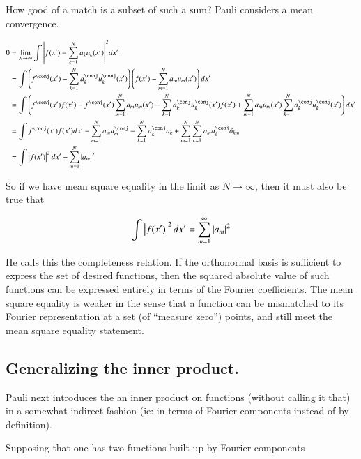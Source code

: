 \documentclass{article}
\begin{document}
How good of a match is a subset of such a sum?  Pauli considers a mean convergence.

\begin{align*}
0 &= \lim_{N \rightarrow \infty}\int 
{\Abs{f(x') -\sum_{k=1}^N a_k u_k(x') }}^2 dx'  \\
&=
\int \left(f^\conj(x') -\sum_{k=1}^N a_k^\conj u_k^\conj(x') \right) \left(f(x') - \sum_{m=1}^N a_m u_m(x') \right) 
dx' \\
&=
\int 
\left( f^\conj(x') f(x') 
-f^\conj(x') \sum_{m=1}^N a_m u_m(x') 
- \sum_{k=1}^N a_k^\conj u_k^\conj(x') f(x') 
+ \sum_{m=1}^N a_m u_m(x') \sum_{k=1}^N a_k^\conj u_k^\conj(x')  \right)
dx' \\
&=
\int f^\conj(x') f(x') dx'
- \sum_{m=1}^N a_m a_m^\conj
- \sum_{k=1}^N a_k^\conj a_k
+ \sum_{m=1}^N \sum_{k=1}^N a_m a_k^\conj \delta_{km} \\
&= \int \Abs{f(x')}^2 dx' - \sum_{m=1}^N \Abs{a_m}^2 \\
\end{align*}

So if we have mean square equality in the limit as $N \rightarrow \infty$, then it must also be true that

\begin{align*}
\int \left\lvert{f(x')}\right\rvert^2 dx' = \sum_{m=1}^\infty \left\lvert{a_m}\right\rvert^2 \\
\end{align*}

He calls this the completeness relation.  If the orthonormal basis is sufficient to express the set of desired functions, then
the squared absolute value of such functions can be expressed entirely in terms of the Fourier coefficients.  The mean square
equality is weaker in the sense that a function can be mismatched to its Fourier representation at a set (of ``measure zero'') points,
and still meet the mean square equality statement.

\subsection{Generalizing the inner product. }

Pauli next introduces the an inner product on functions (without calling it that) 
in a somewhat indirect
fashion (ie: in terms of Fourier components instead of by definition).

Supposing that one has two functions built up by Fourier components
\end{document}
